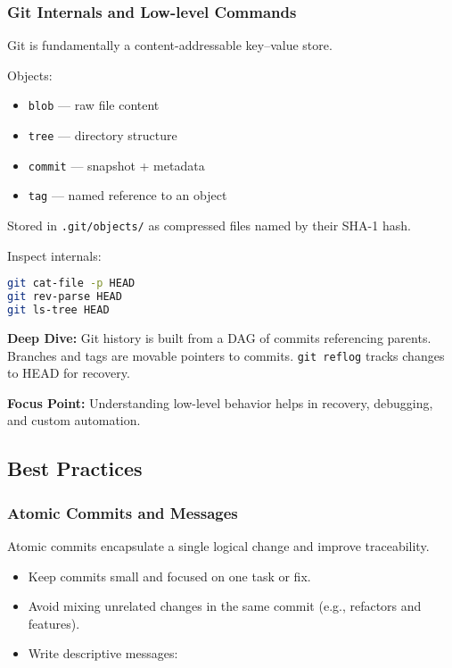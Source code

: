 \documentclass[a4paper,12pt]{article}
\begin{document}
\subsubsection{Git Internals and Low-level Commands}

Git is fundamentally a content-addressable key–value store.

Objects:
\begin{itemize}
  \item \texttt{blob} — raw file content
  \item \texttt{tree} — directory structure
  \item \texttt{commit} — snapshot + metadata
  \item \texttt{tag} — named reference to an object
\end{itemize}

Stored in \texttt{.git/objects/} as compressed files named by their SHA-1 hash.

Inspect internals:

\begin{lstlisting}[language=bash]
git cat-file -p HEAD
git rev-parse HEAD
git ls-tree HEAD
\end{lstlisting}

\textbf{Deep Dive:} Git history is built from a DAG of commits referencing parents. Branches and tags are movable pointers to commits. \texttt{git reflog} tracks changes to HEAD for recovery.

\textbf{Focus Point:} Understanding low-level behavior helps in recovery, debugging, and custom automation.

\subsection{Best Practices}

\subsubsection{Atomic Commits and Messages}

Atomic commits encapsulate a single logical change and improve traceability.

\begin{itemize}
  \item Keep commits small and focused on one task or fix.
  \item Avoid mixing unrelated changes in the same commit (e.g., refactors and features).
  \item Write descriptive messages:
\end{itemize}
\end{document}
